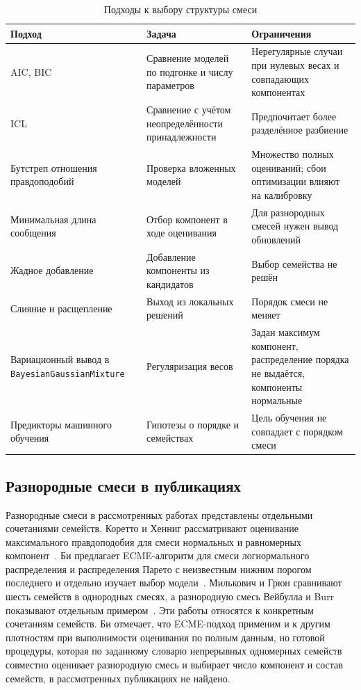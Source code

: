 \begin{table}[!ht]
    \centering
    \small
    \renewcommand{\arraystretch}{1.25}
    \caption{Подходы к выбору структуры смеси}\label{tab:structure}
    \begin{tabularx}{\textwidth}{@{}>{\raggedright\arraybackslash}p{}>{\raggedright\arraybackslash}X>{\raggedright\arraybackslash}X@{}}
        \toprule
        \textbf{Подход} & \textbf{Задача} & \textbf{Ограничения}\\
        \midrule
        AIC, BIC & Сравнение моделей по подгонке и числу параметров & Нерегулярные случаи при нулевых весах и совпадающих компонентах\\
        \addlinespace
        ICL & Сравнение с учётом неопределённости принадлежности & Предпочитает более разделённое разбиение\\
        \addlinespace
        Бутстреп отношения правдоподобий & Проверка вложенных моделей & Множество полных оцениваний; сбои оптимизации влияют на калибровку\\
        \addlinespace
        Минимальная длина сообщения & Отбор компонент в ходе оценивания & Для разнородных смесей нужен вывод обновлений\\
        \addlinespace
        Жадное добавление & Добавление компоненты из кандидатов & Выбор семейства не решён\\
        \addlinespace
        Слияние и расщепление & Выход из локальных решений & Порядок смеси не меняет\\
        \addlinespace
        Вариационный вывод в \texttt{BayesianGaussianMixture} & Регуляризация весов & Задан максимум компонент, распределение порядка не выдаётся, компоненты нормальные\\
        \addlinespace
        Предикторы машинного обучения & Гипотезы о порядке и семействах & Цель обучения не совпадает с порядком смеси\\
        \bottomrule
    \end{tabularx}
\end{table}

\subsection{Разнородные смеси в публикациях}
\label{sec:heterogeneous-literature}

Разнородные смеси в рассмотренных работах представлены отдельными сочетаниями семейств. Коретто и Хенниг рассматривают оценивание максимального правдоподобия для смеси нормальных и равномерных компонент~\cite{Coretto2011}. Би предлагает ECME-алгоритм для смеси логнормального распределения и распределения Парето с неизвестным нижним порогом последнего и отдельно изучает выбор модели~\cite{Bee2026}. Милькович и Грюн сравнивают шесть семейств в однородных смесях, а разнородную смесь Вейбулла и Burr показывают отдельным примером~\cite{MiljkovicGrun2016}. Эти работы относятся к конкретным сочетаниям семейств. Би отмечает, что ECME-подход применим и к другим плотностям при выполнимости оценивания по полным данным, но готовой процедуры, которая по заданному словарю непрерывных одномерных семейств совместно оценивает разнородную смесь и выбирает число компонент и состав семейств, в рассмотренных публикациях не найдено.

